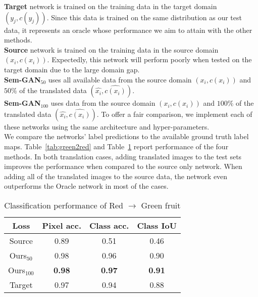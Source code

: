 \textbf{Target} network is trained on the training data in the target domain $(y_j, c(y_j))$. Since this data is trained on the same distribution as our test data, it represents an oracle whose performance we aim to attain with the other methods.\\

\textbf{Source} network is trained on the training data in the source domain $(x_i, c(x_i))$. Expectedly, this network will perform poorly when tested on the target domain due to the large domain gap.\\

\textbf{Sem-GAN$_{50}$} uses all available data from the source domain $(x_i, c(x_i))$ and $50\%$ of the translated data $(\widehat{x_i}, \widehat{c(x_i)})$.\\

\textbf{Sem-GAN$_{100}$} uses data from the source domain $(x_i, c(x_i))$ and $100\%$ of the translated data $(\widehat{x_i}, \widehat{c(x_i)})$. To offer a fair comparison, we implement each of these networks using the same architecture and hyper-parameters.\\

We compare the networks' label predictions to the available ground truth label maps. Table~\ref{tab:green2red} and Table~\ref{tab:red2green} report performance of the four methods. In both translation cases, adding translated images to the test sets improves the performance when compared to the source only network. When adding all of the translated images to the source data, the network even outperforms the Oracle network in most of the cases.

\begin{table}[!htpb]
    \begin{center}
    \begin{tabular}{c c c c}
        \textbf{Loss} & \textbf{Pixel acc.} & \textbf{Class acc.} & \textbf{Class IoU} \\
        \hline
        Source & 0.89 & 0.51 & 0.46\\
        Ours$_{50}$ & 0.98 & 0.96 & 0.90\\
        Ours$_{100}$ & \textbf{0.98} & \textbf{0.97} & \textbf{0.91} \\
        \hline
        Target & 0.97 & 0.94 & 0.88
    \end{tabular}
    \end{center}
    \caption{Classification performance of Red $\to$ Green fruit}
    \label{tab:red2green}
\end{table}

